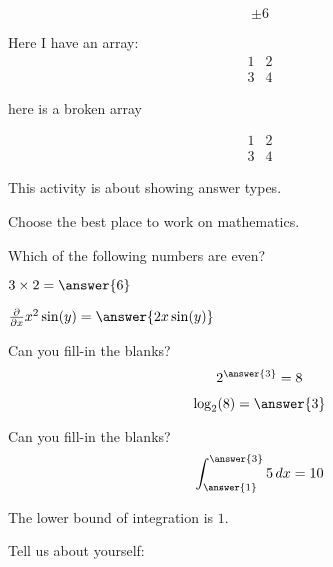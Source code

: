 \documentclass{ximera}
\begin{document}
\[
\pm 6
\]

Here I have an array:
\[
\begin{array}{|c|c|}
  1 & 2 \\
  3 & 4
\end{array}
\]

here is a broken array

\[
\begin{array}{|c|c|}
  1 & 2 \\
  
  3 & 4
\end{array}
\]


This activity is about showing answer types.
\begin{problem}  
  Choose the best place to work on mathematics.  
  \begin{multipleChoice}  
  \end{multipleChoice}
\end{problem}


\begin{problem}  
  Which of the following numbers are even?  
  \begin{selectAll}  
  \end{selectAll}  
\end{problem}


\begin{problem}  
  $3\times 2 = \answer{6}$  
\end{problem} 

\begin{problem}  
  $\frac{\partial}{\partial x} x^2\sin(y) =  \answer{2x\sin(y)}$  
\end{problem} 

\begin{problem}
  Can you fill-in the blanks?
  \[
  2^{\answer{3}} = 8
  \]
  \begin{problem}
    \[
    \log_2(8) = \answer{3}
    \]
  \end{problem}
\end{problem}

\begin{problem}
  Can you fill-in the blanks?
  \[
  \int_{\answer{1}}^{\answer{3}}5 \, d x = 10
  \]
  \begin{hint}
    The lower bound of integration is $1$.
  \end{hint}
\end{problem}



\begin{problem}
  Tell us about yourself:
  \begin{freeResponse}
  \end{freeResponse}
\end{problem}
\end{document}
